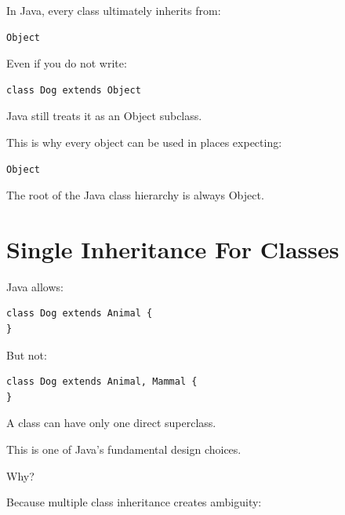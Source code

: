 \documentclass[11pt,a4paper]{book}
\begin{document}
In Java, every class ultimately inherits from:

\begin{verbatim}
Object
\end{verbatim}


Even if you do not write:

\begin{verbatim}
class Dog extends Object
\end{verbatim}

Java still treats it as an Object subclass.


This is why every object can be used in places expecting:

\begin{verbatim}
Object
\end{verbatim}


\begin{idea}
The root of the Java class hierarchy is always Object.
\end{idea}


\section{Single Inheritance For Classes}

Java allows:

\begin{verbatim}
class Dog extends Animal {
}
\end{verbatim}

But not:

\begin{verbatim}
class Dog extends Animal, Mammal {
}
\end{verbatim}


A class can have only one direct superclass.

This is one of Java's fundamental design choices.


Why?

Because multiple class inheritance creates ambiguity:
\end{document}
